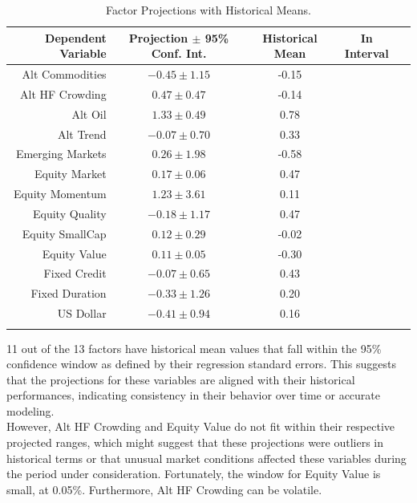 \documentclass{ledger}
\begin{document}
\begin{table}[h]
\small
\centering
	\caption{Factor Projections with Historical Means. \label{table:projection_vs_actual}}
	\begin{tabular}{rcccc}
	\toprule
		\textbf{Dependent Variable} & \textbf{Projection $\pm$ 95\% Conf. Int.} & \textbf{Historical Mean} & \textbf{In Interval} \\
	\midrule
		Alt Commodities     & $-0.45 \pm 1.15$ & -0.15 & \checkmark \\
		Alt HF Crowding     & $0.47 \pm 0.47$ & -0.14 &  \\
		Alt Oil             & $1.33 \pm 0.49$ & 0.78 & \checkmark \\
		Alt Trend           & $-0.07 \pm 0.70$ & 0.33 & \checkmark \\
		Emerging Markets    & $0.26 \pm 1.98$ & -0.58 & \checkmark \\
		Equity Market       & $0.17 \pm 0.06$ & 0.47 & \checkmark \\
		Equity Momentum     & $1.23 \pm 3.61$ & 0.11 & \checkmark \\
		Equity Quality      & $-0.18 \pm 1.17$ & 0.47 & \checkmark \\
		Equity SmallCap     & $0.12 \pm 0.29$ & -0.02 & \checkmark \\
		Equity Value        & $0.11 \pm 0.05$ & -0.30 &  \\
		Fixed Credit        & $-0.07 \pm 0.65$ & 0.43 & \checkmark \\
		Fixed Duration      & $-0.33 \pm 1.26$ & 0.20 & \checkmark \\
		US Dollar           & $-0.41 \pm 0.94$ & 0.16 & \checkmark \\
	\bottomrule \\
	\end{tabular}
\end{table}

11 out of the 13 factors have historical mean values that fall within the 95\% confidence window as defined by their regression standard errors. This suggests that the projections for these variables are aligned with their historical performances, indicating consistency in their behavior over time or accurate modeling. \\

However, Alt HF Crowding and Equity Value do not fit within their respective projected ranges, which might suggest that these projections were outliers in historical terms or that unusual market conditions affected these variables during the period under consideration. Fortunately, the window for Equity Value is small, at 0.05\%. Furthermore, Alt HF Crowding can be volatile. \\
\end{document}
